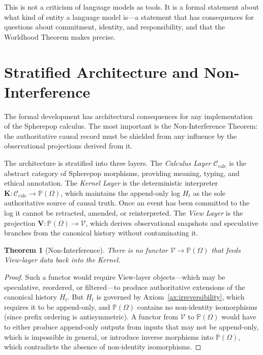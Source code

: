 \documentclass[12pt]{article}
\theoremstyle{plain}
\newtheorem{theorem}{Theorem}[section]
\theoremstyle{definition}
\theoremstyle{remark}
\newcommand{\PathCat}{\mathbb{P}(\Omega)}
\newcommand{\ViewCat}{\mathcal{V}}
\newcommand{\KernelFun}{\mathbf{K}}
\newcommand{\ViewFun}{\mathbf{V}}
\begin{document}
This is not a criticism of language models as tools.  It is a formal statement
about what kind of entity a language model is---a statement that has consequences
for questions about commitment, identity, and responsibility, and that the
Worldhood Theorem makes precise.


\section{Stratified Architecture and Non-Interference}
\label{sec:stratified}

The formal development has architectural consequences for any implementation of
the Spherepop calculus.  The most important is the Non-Interference Theorem:
the authoritative causal record must be shielded from any influence by the
observational projections derived from it.

The architecture is stratified into three layers.  The \emph{Calculus Layer}
$\mathcal{C}_{\mathrm{calc}}$ is the abstract category of Spherepop morphisms,
providing meaning, typing, and ethical annotation.  The \emph{Kernel Layer} is
the deterministic interpreter $\KernelFun : \mathcal{C}_{\mathrm{calc}} \to
\PathCat$, which maintains the append-only log $H_t$ as the sole authoritative
source of causal truth.  Once an event has been committed to the log it cannot
be retracted, amended, or reinterpreted.  The \emph{View Layer} is the
projection $\ViewFun : \PathCat \to \ViewCat$, which derives observational
snapshots and speculative branches from the canonical history without
contaminating it.

\begin{theorem}[Non-Interference]
\label{thm:non-interference}
There is no functor $\ViewCat \to \PathCat$ that feeds View-layer data back
into the Kernel.
\end{theorem}

\begin{proof}
Such a functor would require View-layer objects---which may be speculative,
reordered, or filtered---to produce authoritative extensions of the canonical
history $H_t$.  But $H_t$ is governed by Axiom~\ref{ax:irreversibility}, which
requires it to be append-only, and $\PathCat$ contains no non-identity
isomorphisms (since prefix ordering is antisymmetric).  A functor from
$\ViewCat$ to $\PathCat$ would have to either produce append-only outputs from
inputs that may not be append-only, which is impossible in general, or introduce
inverse morphisms into $\PathCat$, which contradicts the absence of non-identity
isomorphisms.
\end{proof}
\end{document}
